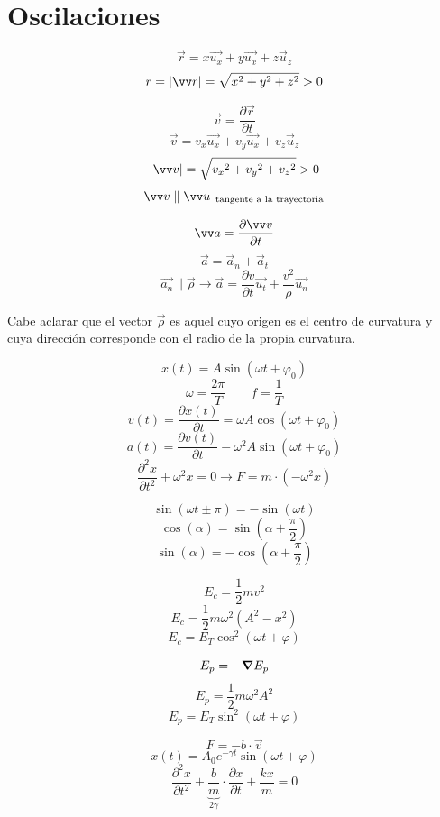 \documentclass[a4paper]{book}
\begin{document}
\section{Oscilaciones}
\setlength{\columnsep}{20pt}
\begin{fleqn}
	\begin{multicols}{2}
		\[\vec{r} = x \vec{u_x} + y \vec{u_x} + z \vec{u}_z \]
		\[r = \abs{\vec{r}} = \sqrt{x^2 +y^2+z^2} >0\]

		\[\vec{v} = \frac{\partial \vec{r}}{\partial t}\]
		\[\vec{v} = v_x \vec{u_x} + v_y \vec{u_x} + v_z \vec{u}_z\]
		\[\abs{\vec{v}} = \sqrt{{v_x}^2 +{v_y}^2+{v_z}^2} >0\]
		\[\vec{v} \parallel \vec{u}_\text{\, tangente a la trayectoria} \]

		\[\vec{a} =\pdv{\vec{v}}{t}\]
		\[\vec{a} = \vec{a}_n + \vec{a}_t\]
		\[\vec{a_n} \parallel \vec{\rho} \longrightarrow \vec{a} = \frac{\partial v}{\partial t}\vec{u_t} + \frac{v^2}{\rho }\vec{u_n}\]

		\noindent Cabe aclarar que el vector $\vec{\rho}$ es aquel cuyo origen es el centro de curvatura y cuya dirección corresponde con el radio de la propia curvatura.

		\[x(t) = A\sin{\left(\omega t + \varphi_0\right)}\]
		\[\omega = \frac{2\pi}{T} \qquad f = \frac{1}{T}\]
		\[v(t) = \frac{\partial x(t)}{\partial t} = \omega A \cos{\left(\omega t + \varphi_0\right)}\]
		\[a(t) = \frac{\partial v(t)}{\partial t} -\omega^2 A \sin{\left(\omega t + \varphi_0\right)}\]
		\[\frac{\partial ^2 x}{\partial t^2}+\omega^2 x = 0 \longrightarrow F= m\cdot \left( -\omega^2x \right)\]

		\vspace{2 cm}
		\[\sin{\left(\omega t \pm \pi \right)}= -\sin{\left(\omega t\right)}\]
		\[\cos{\left(\alpha\right)} = \sin{\left(\alpha + \frac{\pi}{2}\right)}\]
		\[\sin{\left(\alpha\right)} = - \cos{\left(\alpha + \frac{\pi}{2}\right)}\]

		\[E_c=\frac{1}{2}mv^2\]
		\[E_c=\frac{1}{2}m\omega ^2\left( A^2-x^2 \right)\]
		\[E_c = E_T \cos^2{\left(\omega t + \varphi\right)}\]

		\[E_p = -\grad E_p\]
		\[E_p =\frac{1}{2}m\omega ^2A^2\]
		\[E_p = E_T \sin^2{\left(\omega t + \varphi \right)}\]

		\[F =-b\cdot \vec{v}\]
		\[x(t)=A_0e^{-\gamma t}\sin{\left(\omega t + \varphi\right)}\]
		\[\frac{\partial ^2x}{\partial t^2}+ \underbrace{\frac{b}{m}}_{2\gamma}\cdot \frac{\partial x}{\partial t}+\frac{kx}{m}=0\]

	\end{multicols}
\end{fleqn}
\end{document}
